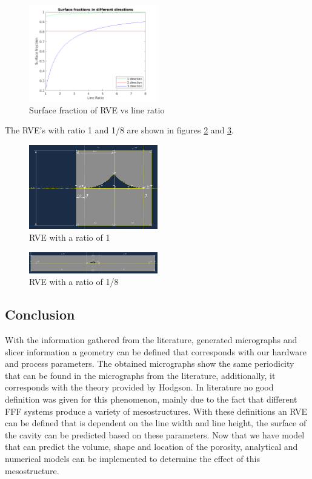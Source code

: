 \begin{figure}[H]
    \centering
    \includegraphics[width=0.5\textwidth]{chapter_4_RVE_Definition/figures/Surfacefraction.png}
    \caption{Surface fraction of RVE vs line ratio}
    \label{fig:Surfacefraction}
\end{figure}

The RVE's with ratio 1 and 1/8 are shown in figures \ref{fig:RVE1} and \ref{fig:RVE1/8}.
\begin{figure}[H]
    \centering
    \includegraphics[width=0.5\textwidth]{chapter_4_RVE_Definition/figures/RVER1.png}
    \caption{RVE with a ratio of 1}
    \label{fig:RVE1}
\end{figure}

\begin{figure}[H]
    \centering
    \includegraphics[width=0.5\textwidth]{chapter_4_RVE_Definition/figures/RVER8.png}
    \caption{RVE with a ratio of 1/8}
    \label{fig:RVE1/8}
\end{figure}




\subsection{Conclusion}
With the information gathered from the literature, generated micrographs and slicer information a geometry can be defined that corresponds with our hardware and process parameters. The obtained micrographs show the same periodicity that can be found in the micrographs from the literature, additionally, it corresponds with the theory provided by Hodgson. In literature no good definition was given for this phenomenon, mainly due to the fact that different FFF systems produce a variety of mesostructures. 
With these definitions an RVE can be defined that is dependent on the line width and line height, the surface of the cavity can be predicted based on these parameters. Now that we have model that can predict the volume, shape and location of the porosity, analytical and numerical models can be implemented to determine the effect of this mesostructure. 

